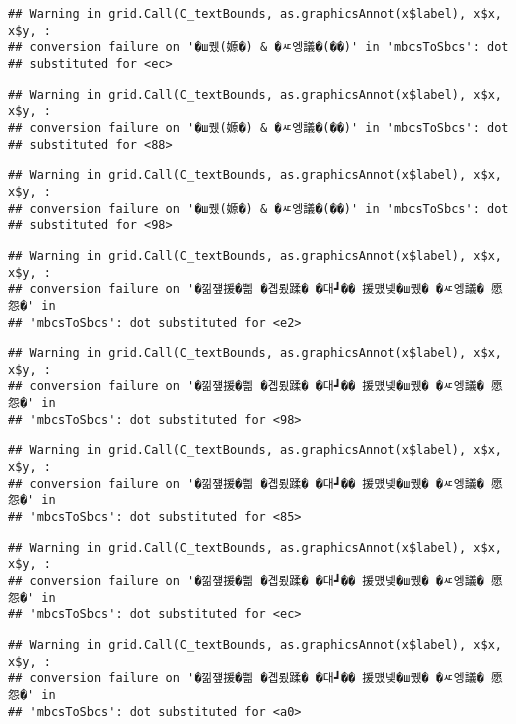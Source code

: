 \documentclass[
]{article}
\begin{document}
\begin{verbatim}
## Warning in grid.Call(C_textBounds, as.graphicsAnnot(x$label), x$x, x$y, :
## conversion failure on '�ш퀬(嫄�) & �ㅼ엥議�(��)' in 'mbcsToSbcs': dot
## substituted for <ec>
\end{verbatim}

\begin{verbatim}
## Warning in grid.Call(C_textBounds, as.graphicsAnnot(x$label), x$x, x$y, :
## conversion failure on '�ш퀬(嫄�) & �ㅼ엥議�(��)' in 'mbcsToSbcs': dot
## substituted for <88>
\end{verbatim}

\begin{verbatim}
## Warning in grid.Call(C_textBounds, as.graphicsAnnot(x$label), x$x, x$y, :
## conversion failure on '�ш퀬(嫄�) & �ㅼ엥議�(��)' in 'mbcsToSbcs': dot
## substituted for <98>
\end{verbatim}

\begin{verbatim}
## Warning in grid.Call(C_textBounds, as.graphicsAnnot(x$label), x$x, x$y, :
## conversion failure on '�낆쟾援�쁾 �곕룄蹂� �대┛�� 援먰넻�ш퀬� �ㅼ엥議� 愿怨�' in
## 'mbcsToSbcs': dot substituted for <e2>
\end{verbatim}

\begin{verbatim}
## Warning in grid.Call(C_textBounds, as.graphicsAnnot(x$label), x$x, x$y, :
## conversion failure on '�낆쟾援�쁾 �곕룄蹂� �대┛�� 援먰넻�ш퀬� �ㅼ엥議� 愿怨�' in
## 'mbcsToSbcs': dot substituted for <98>
\end{verbatim}

\begin{verbatim}
## Warning in grid.Call(C_textBounds, as.graphicsAnnot(x$label), x$x, x$y, :
## conversion failure on '�낆쟾援�쁾 �곕룄蹂� �대┛�� 援먰넻�ш퀬� �ㅼ엥議� 愿怨�' in
## 'mbcsToSbcs': dot substituted for <85>
\end{verbatim}

\begin{verbatim}
## Warning in grid.Call(C_textBounds, as.graphicsAnnot(x$label), x$x, x$y, :
## conversion failure on '�낆쟾援�쁾 �곕룄蹂� �대┛�� 援먰넻�ш퀬� �ㅼ엥議� 愿怨�' in
## 'mbcsToSbcs': dot substituted for <ec>
\end{verbatim}

\begin{verbatim}
## Warning in grid.Call(C_textBounds, as.graphicsAnnot(x$label), x$x, x$y, :
## conversion failure on '�낆쟾援�쁾 �곕룄蹂� �대┛�� 援먰넻�ш퀬� �ㅼ엥議� 愿怨�' in
## 'mbcsToSbcs': dot substituted for <a0>
\end{verbatim}
\end{document}
